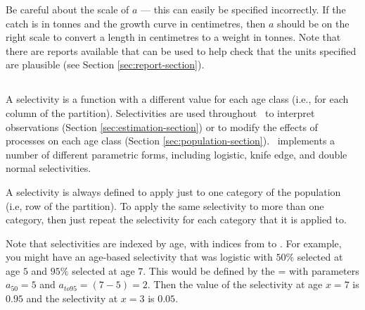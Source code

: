Be careful about the scale of $a$ --- this can easily be specified incorrectly. If the catch is in tonnes and the growth curve in centimetres, then $a$ should be on the right scale to convert a length in centimetres to a weight in tonnes. Note that there are reports available that can be used to help check that the units specified are plausible (see Section \ref{sec:report-section}).


\subsubsection*{}

\subsection{\label{sec:weightless-model}}

\subsection{\label{sec:maturity-notinpartition}}

\newpage

\subsection{\label{sec:selectivities}}

A selectivity is a function with a different value for each age class (i.e., for each column of the partition). Selectivities are used throughout \iSAM\ to interpret observations (Section \ref{sec:estimation-section}) or to modify the effects of processes on each age class (Section \ref{sec:population-section}). \iSAM\ implements a number of different parametric forms, including logistic, knife edge, and double normal selectivities.

A selectivity is always defined to apply just to one category of the population (i.e, row of the partition). To apply the same selectivity to more than one category, then just repeat the selectivity for each category that it is applied to.

Note that selectivities are indexed by age, with indices from  to . For example, you might have an age-based selectivity that was logistic with $50\%$ selected at age $5$ and $95\%$ selected at age $7$. This would be defined by the = with parameters $a_{50}=5$ and $a_{to95}=(7-5)=2$. Then the value of the selectivity at age $x=7$ is $0.95$ and the selectivity at $x=3$ is $0.05$.

